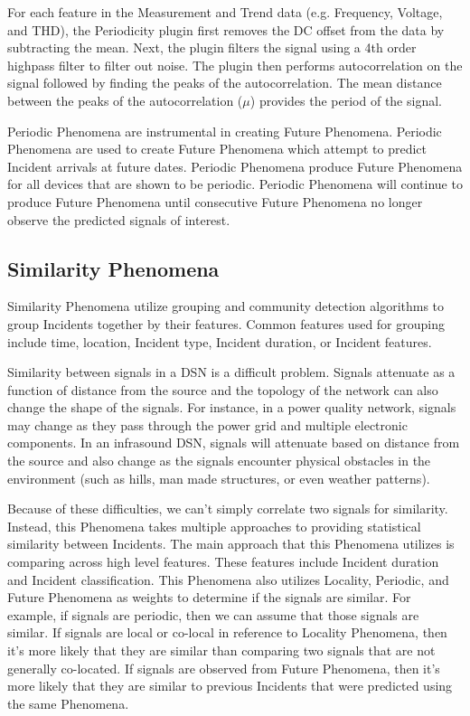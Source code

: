 For each feature in the Measurement and Trend data (e.g. Frequency, Voltage, and THD), the Periodicity plugin first removes the DC offset from the data by subtracting the mean. Next, the plugin filters the signal using a 4th order highpass filter to filter out noise. The plugin then performs autocorrelation on the signal followed by finding the peaks of the autocorrelation. The mean distance between the peaks of the autocorrelation ($\mu$) provides the period of the signal.

Periodic Phenomena are instrumental in creating Future Phenomena. Periodic Phenomena are used to create Future Phenomena which attempt to predict Incident arrivals at future dates. Periodic Phenomena produce Future Phenomena for all devices that are shown to be periodic. Periodic Phenomena will continue to produce Future Phenomena until consecutive Future Phenomena no longer observe the predicted signals of interest.

\subsection{Similarity Phenomena}\label{subsec:similarity-phenomena}
Similarity Phenomena utilize grouping and community detection algorithms to group Incidents together by their features. Common features used for grouping include time, location, Incident type, Incident duration, or Incident features.

Similarity between signals in a DSN is a difficult problem. Signals attenuate as a function of distance from the source and the topology of the network can also change the shape of the signals. For instance, in a power quality network, signals may change as they pass through the power grid and multiple electronic components. In an infrasound DSN, signals will attenuate based on distance from the source and also change as the signals encounter physical obstacles in the environment (such as hills, man made structures, or even weather patterns).

Because of these difficulties, we can't simply correlate two signals for similarity. Instead, this Phenomena takes multiple approaches to providing statistical similarity between Incidents. The main approach that this Phenomena utilizes is comparing across high level features. These features include Incident duration and Incident classification. This Phenomena also utilizes Locality, Periodic, and Future Phenomena as weights to determine if the signals are similar. For example, if signals are periodic, then we can assume that those signals are similar. If signals are local or co-local in reference to Locality Phenomena, then it's more likely that they are similar than comparing two signals that are not generally co-located. If signals are observed from Future Phenomena, then it's more likely that they are similar to previous Incidents that were predicted using the same Phenomena.

